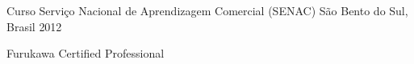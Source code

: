 \begin{cventries}
  \cventry
	{Curso} %
	{Serviço Nacional de Aprendizagem Comercial (SENAC)} %
	{São Bento do Sul, Brasil} %
	{2012} %
	{
	    \begin{cvitems} %
	      \item {Furukawa Certified Professional}
	    \end{cvitems}
	}

\end{cventries}
